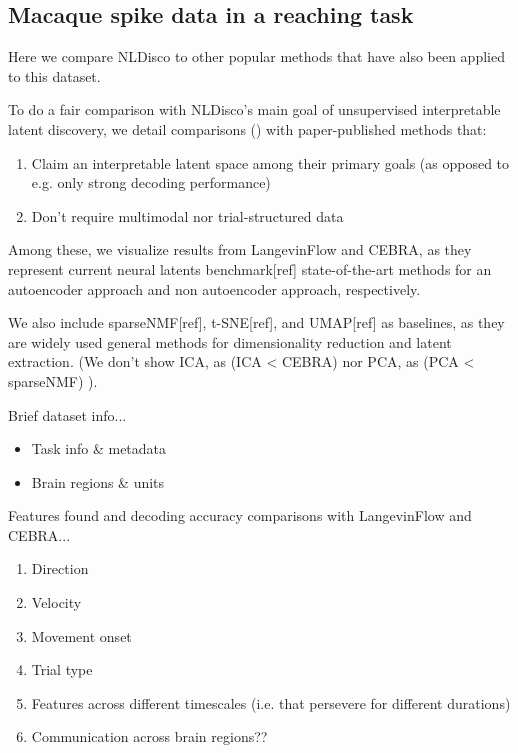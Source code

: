 \subsection{Macaque spike data in a reaching task}

Here we compare NLDisco to other popular methods that have also been applied to this dataset.

To do a fair comparison with NLDisco's main goal of unsupervised interpretable latent discovery, we detail comparisons () with paper-published methods that:

\begin{enumerate}
\item Claim an interpretable latent space among their primary goals (as opposed to e.g. only strong decoding performance)
\item Don't require multimodal nor trial-structured data
\end{enumerate}
    
Among these, we visualize results from LangevinFlow and CEBRA, as they represent current neural latents benchmark[ref] state-of-the-art methods for an autoencoder approach and non autoencoder approach, respectively. 

We also include sparseNMF[ref], t-SNE[ref], and UMAP[ref] as baselines, as they are widely used general methods for dimensionality reduction and latent extraction.
(We don't show ICA, as (ICA < CEBRA) nor PCA, as (PCA < sparseNMF) ).

Brief dataset info...
\begin{itemize}
    \item Task info \& metadata
    \item Brain regions \& units
\end{itemize}

Features found and decoding accuracy comparisons with LangevinFlow and CEBRA...
\begin{enumerate}
    \item Direction
    \item Velocity
    \item Movement onset
    \item Trial type
    \item Features across different timescales (i.e. that persevere for different durations)
    \item Communication across brain regions??
\end{enumerate}


